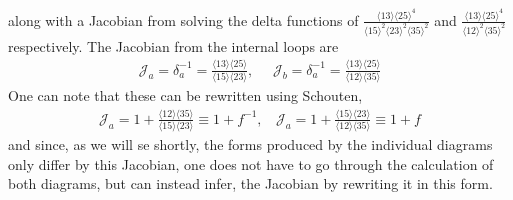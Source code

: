 \documentclass[letter,11pt]{article}
\newcommand{\J}{\mathcal{J}}
\newcommand{\ab}[1]{\langle #1 \rangle}
\begin{document}
along with a Jacobian from solving the delta functions of $\frac{\ab{13}\ab{25}^4}{\ab{15}^2\ab{23}^2\ab{35}^2}$ and $\frac{\ab{13}\ab{25}^4}{\ab{12}^2\ab{35}^2}$ respectively. The Jacobian from the internal loops are
\begin{equation}
	\begin{aligned}
		\J_a=\delta_a^{-1}=\frac{\ab{13}\ab{25}}{\ab{15}\ab{23}},~~~~~~\J_b=\delta_a^{-1}=\frac{\ab{13}\ab{25}}{\ab{12}\ab{35}}
	\end{aligned}
\end{equation}
One can note that these can be rewritten using Schouten,
\begin{equation}
	\begin{aligned}
		\J_a=1+\frac{\ab{12}\ab{35}}{\ab{15}\ab{23}}\equiv1+f^{-1},~~~~\J_a=1+\frac{\ab{15}\ab{23}}{\ab{12}\ab{35}}\equiv1+f
	\end{aligned}
\end{equation}
and since, as we will se shortly, the forms produced by the individual diagrams only differ by this Jacobian, one does not have to go through the calculation of both diagrams, but can instead infer, the Jacobian by rewriting it in this form.
\end{document}
